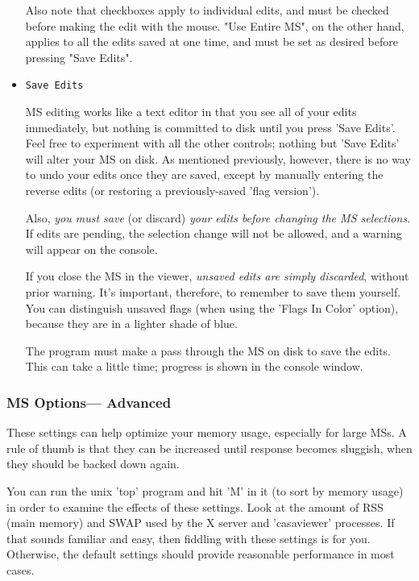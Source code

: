 \begin{itemize}
Also note that checkboxes apply to individual edits, and must be checked
before making the edit with the mouse.  "Use Entire MS", on the other hand,
applies to all the edits saved at one time, and must be set as desired
before pressing "Save Edits".

\item {\tt Save Edits}

MS editing works like a text editor in that
you see all of your edits immediately, but nothing is committed to disk
until you press 'Save Edits'.  Feel free to experiment with all the other
controls; nothing but 'Save Edits' will alter your MS on disk. 
As mentioned previously, however, there is no way to undo your edits once
they are saved, except by manually entering the reverse edits (or restoring
a previously-saved 'flag version').

Also, {\it you must save} (or discard) {\it your edits before changing the 
MS selections}.  If edits are pending, the selection change will not be 
allowed, and a warning will appear on the console.  

If you close the MS in the viewer, {\it unsaved edits are simply discarded},
without prior warning.  It's important, therefore, to remember to save them
yourself.  You can distinguish unsaved flags (when using the 'Flags In Color'
option), because they are in a lighter shade of blue.

The program must make a pass through the MS on disk to save the edits.
This can take a little time; progress is shown in the console window.

\end{itemize}

\subsubsection{MS Options---  Advanced}
\label{section:display.ms.adjust.adv}

These settings can help optimize your memory usage, especially for
large MSs.  A rule of thumb is that they can be increased until response
becomes sluggish, when they should be backed down again.

You can run the unix 'top' program and hit 'M' in it (to sort by memory
usage) in order to examine the effects of these settings.  Look at the
amount of RSS (main memory) and SWAP used by the X server and 'casaviewer'
processes.  If that sounds familiar and easy, then fiddling with these
settings is for you.  Otherwise, the default settings should provide
reasonable performance in most cases.

